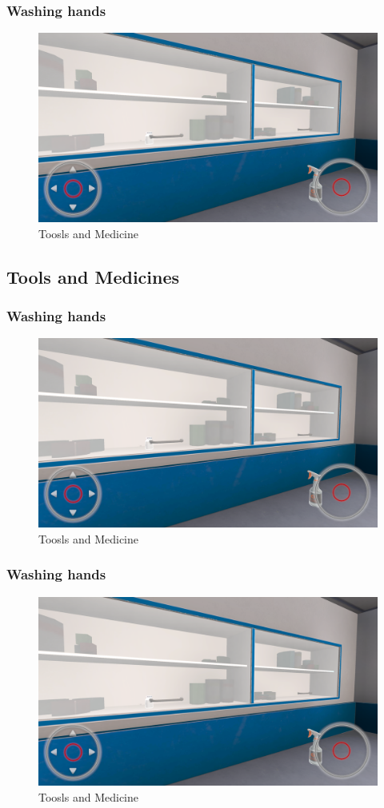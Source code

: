 \subsubsection{Washing hands}
\begin{figure}[h]
	\centering
	\includegraphics[width=0.65\linewidth]{Images/Toosls and Medicine.png}
	\caption{Toosls and Medicine}
	\label{fig:system-diagram}
\end{figure}



\subsection{Tools and Medicines}
\subsubsection{Washing hands}
\begin{figure}[h]
	\centering
	\includegraphics[width=0.65\linewidth]{Images/Toosls and Medicine.png}
	\caption{Toosls and Medicine}
	\label{fig:system-diagram}
\end{figure}

\subsubsection{Washing hands}
\begin{figure}[h]
	\centering
	\includegraphics[width=0.65\linewidth]{Images/Toosls and Medicine.png}
	\caption{Toosls and Medicine}
	\label{fig:system-diagram}
\end{figure}

